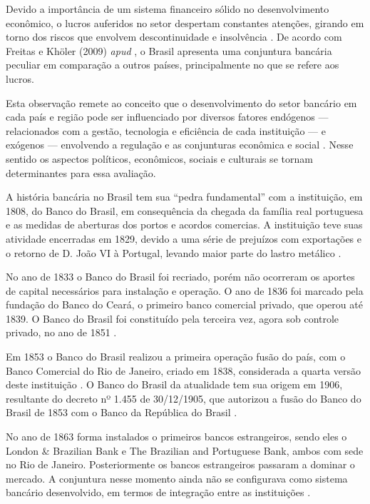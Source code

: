 \documentclass[12pt,12pt,openright,oneside,a4paper,chapter=TITLE,section=TITLE,subsection=TITLE,subsubsection=TITLE,english,french,spanish,portugues,sumario=tradicional]{abntex2}
\begin{document}
Devido a importância de um sistema financeiro sólido no desenvolvimento econômico, o lucros auferidos no setor despertam constantes atenções, girando em torno dos riscos que envolvem descontinuidade e insolvência \cite{couto:2002}. De acordo com Freitas e Khöler (2009) \emph{apud} \textcite{dantas:2012}, o Brasil apresenta uma conjuntura bancária peculiar em comparação a outros países, principalmente no que se refere aos lucros.

Esta observação remete ao conceito que o desenvolvimento do setor bancário em cada país e região pode ser influenciado por diversos fatores endógenos --- relacionados com a gestão, tecnologia e eficiência de cada instituição --- e exógenos --- envolvendo a regulação e as conjunturas econômica e social \cite{rover:2011}. Nesse sentido os aspectos políticos, econômicos, sociais e culturais se tornam determinantes para essa avaliação.

A história bancária no Brasil tem sua ``pedra fundamental'' com a instituição, em 1808, do Banco do Brasil, em consequência da chegada da família real portuguesa e as medidas de aberturas dos portos e acordos comercias. A instituição teve suas atividade encerradas em 1829, devido a uma série de prejuízos com exportações e o retorno de D. João VI à Portugal, levando maior parte do lastro metálico \cite{camargo:2009}.

No ano de 1833 o Banco do Brasil foi recriado, porém não ocorreram os aportes de capital necessários para instalação e operação. O ano de 1836 foi marcado pela fundação do Banco do Ceará, o primeiro banco comercial privado, que operou até 1839. O Banco do Brasil foi constituído pela terceira vez, agora sob controle privado, no ano de 1851 \cite{camargo:2009}.

Em 1853 o Banco do Brasil realizou a primeira operação fusão do país, com o Banco Comercial do Rio de Janeiro, criado em 1838, considerada a quarta versão deste instituição \cite{camargo:2009}. O Banco do Brasil da atualidade tem sua origem em 1906, resultante do decreto nº 1.455 de 30/12/1905, que autorizou a fusão do Banco do Brasil de 1853 com o Banco da República do Brasil \cite{camargo:2009} \cite{Lei:1455:1905}.

No ano de 1863 forma instalados o primeiros bancos estrangeiros, sendo eles o London \& Brazilian Bank e The Brazilian and Portuguese Bank, ambos com sede no Rio de Janeiro. Posteriormente os bancos estrangeiros passaram a dominar o mercado. A conjuntura nesse momento ainda não se configurava como sistema bancário desenvolvido, em termos de integração entre as instituições \cite{camargo:2009}.
\end{document}
